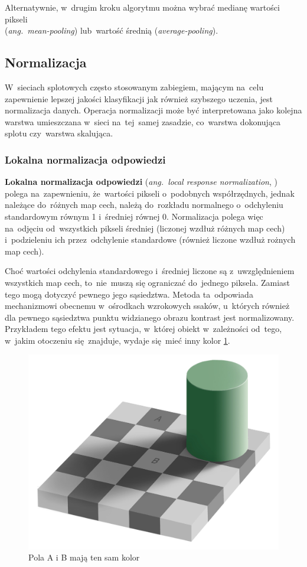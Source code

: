 Alternatywnie, w~drugim kroku algorytmu można wybrać medianę wartości pikseli\\
(\textit{ang.~mean-pooling}) lub~wartość średnią (\textit{average-pooling}).

\subsection{Normalizacja}
W~sieciach splotowych często stosowanym zabiegiem, mającym na~celu zapewnienie lepszej jakości klasyfikacji jak również
szybszego uczenia, jest normalizacja danych. Operacja normalizacji może być interpretowana jako kolejna warstwa
umieszczana w~sieci na~tej~samej zasadzie, co~warstwa dokonująca splotu czy~warstwa skalująca.

\subsubsection{Lokalna normalizacja odpowiedzi} \label{sssec:normalizacja_odpowiedzi}
\textbf{Lokalna normalizacja odpowiedzi} (\textit{ang.~local response normalization}, \cite{HOG}) polega na~zapewnieniu,
że~wartości pikseli o~podobnych współrzędnych, jednak należące do~różnych map cech, należą do~rozkładu normalnego
o~odchyleniu standardowym równym 1 i~średniej równej 0. Normalizacja polega więc na~odjęciu od~wszystkich pikseli
średniej (liczonej wzdłuż różnych map cech) i~podzieleniu ich przez~odchylenie standardowe (również liczone wzdłuż
rożnych map cech).

Choć wartości odchylenia standardowego i~średniej liczone są z~uwzględnieniem wszystkich map cech, to~nie~muszą
się ograniczać do~jednego piksela. Zamiast tego mogą dotyczyć pewnego jego sąsiedztwa. Metoda ta~odpowiada
mechanizmowi obecnemu w~ośrodkach wzrokowych ssaków, u~których również dla pewnego sąsiedztwa punktu widzianego
obrazu kontrast jest normalizowany. Przykładem tego efektu jest sytuacja, w~której obiekt w~zależności od~tego,
w~jakim otoczeniu się~znajduje, wydaje się~mieć inny kolor \ref{img:chess-illusion}.

\begin{figure}[H]
	\centering
	\includegraphics[width=0.8\linewidth]{img/chess-illusion.png}
	\caption{Pola A i B mają ten sam kolor}
	\label{img:chess-illusion}
\end{figure}

